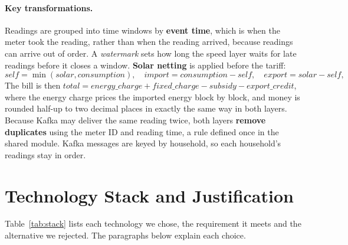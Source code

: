 \documentclass[11pt,a4paper]{article}
\begin{document}
\paragraph{Key transformations.} Readings are grouped into time windows by \textbf{event
time}, which is when the meter took the reading, rather than when the reading arrived,
because readings can arrive out of order. A \emph{watermark} sets how long the speed layer
waits for late readings before it closes a window. \textbf{Solar netting} is applied before
the tariff:
\begin{equation*}
  \mathit{self} = \min(\mathit{solar}, \mathit{consumption}),\quad
  \mathit{import} = \mathit{consumption} - \mathit{self},\quad
  \mathit{export} = \mathit{solar} - \mathit{self},
\end{equation*}
The bill is then $\mathit{total} = \mathit{energy\_charge} + \mathit{fixed\_charge} -
\mathit{subsidy} - \mathit{export\_credit}$, where the energy charge prices the imported
energy block by block, and money is rounded half-up to two decimal places in exactly the
same way in both layers. Because Kafka may deliver the same reading twice, both layers
\textbf{remove duplicates} using the meter ID and reading time, a rule defined once in the
shared module. Kafka messages are keyed by household, so each household's readings stay in
order.

\section{Technology Stack and Justification}
\label{sec:stack}

Table~\ref{tab:stack} lists each technology we chose, the requirement it meets and the
alternative we rejected. The paragraphs below explain each choice.
\end{document}

